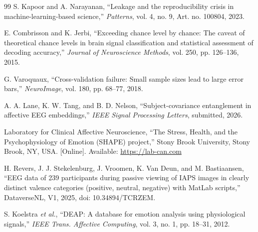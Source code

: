 \documentclass[journal]{IEEEtran}
\begin{document}
\begin{thebibliography}{99}
S. Kapoor and A. Narayanan, ``Leakage and the reproducibility crisis in machine-learning-based science,'' \emph{Patterns}, vol. 4, no. 9, Art. no. 100804, 2023.

E. Combrisson and K. Jerbi, ``Exceeding chance level by chance: The caveat of theoretical chance levels in brain signal classification and statistical assessment of decoding accuracy,'' \emph{Journal of Neuroscience Methods}, vol. 250, pp. 126--136, 2015.

G. Varoquaux, ``Cross-validation failure: Small sample sizes lead to large error bars,'' \emph{NeuroImage}, vol. 180, pp. 68--77, 2018.

A. A. Lane, K. W. Tang, and B. D. Nelson, ``Subject-covariance entanglement in affective EEG embeddings,'' \emph{IEEE Signal Processing Letters}, submitted, 2026.

Laboratory for Clinical Affective Neuroscience, ``The Stress, Health, and the Psychophysiology of Emotion (SHAPE) project,'' Stony Brook University, Stony Brook, NY, USA. [Online]. Available: \url{https://lab-can.com}

H. Revers, J. J. Stekelenburg, J. Vroomen, K. Van Deun, and M. Bastiaansen, ``EEG data of 239 participants during passive viewing of IAPS images in clearly distinct valence categories (positive, neutral, negative) with MatLab scripts,'' DataverseNL, V1, 2025, doi: 10.34894/TCRZEM.

S. Koelstra \emph{et al.}, ``DEAP: A database for emotion analysis using physiological signals,'' \emph{IEEE Trans. Affective Computing}, vol. 3, no. 1, pp. 18--31, 2012.

\end{thebibliography}
\end{document}
